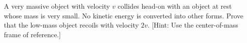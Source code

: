 A very massive object with velocity $v$ collides head-on
with an object at rest whose mass is very small. No kinetic
energy is converted into other forms. Prove that the
low-mass object recoils with velocity $2v$. [Hint: Use the center-of-mass
frame of reference.]

